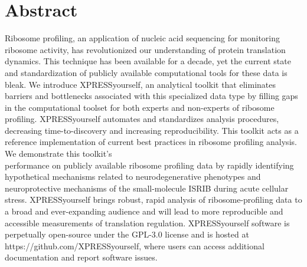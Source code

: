 \documentclass[10pt, oneside]{article}
\begin{document}
\section*{Abstract}
\noindent
Ribosome profiling, an application of nucleic acid sequencing for monitoring ribosome activity, has revolutionized our understanding of protein translation dynamics. This technique has been available for a decade, yet the current state and standardization of publicly available computational tools for these data is bleak. We introduce XPRESSyourself, an analytical toolkit that eliminates barriers and bottlenecks associated with this specialized data type by filling gaps in the computational toolset for both experts and non-experts of ribosome profiling. XPRESSyourself automates and standardizes analysis procedures, decreasing time-to-discovery and increasing reproducibility. This toolkit acts as a reference implementation of current best practices in ribosome profiling analysis. We demonstrate this toolkit's \\performance on publicly available ribosome profiling data by rapidly identifying hypothetical mechanisms related to neurodegenerative phenotypes and neuroprotective mechanisms of the small-molecule ISRIB during acute cellular stress. XPRESSyourself brings robust, rapid analysis of ribosome-profiling data to a broad and ever-expanding audience and will lead to more reproducible and accessible measurements of translation regulation. XPRESSyourself software is perpetually open-source under the GPL-3.0 license and is hosted at https://github.com/XPRESSyourself, where users can access additional documentation and report software issues.\\

\end{document}
